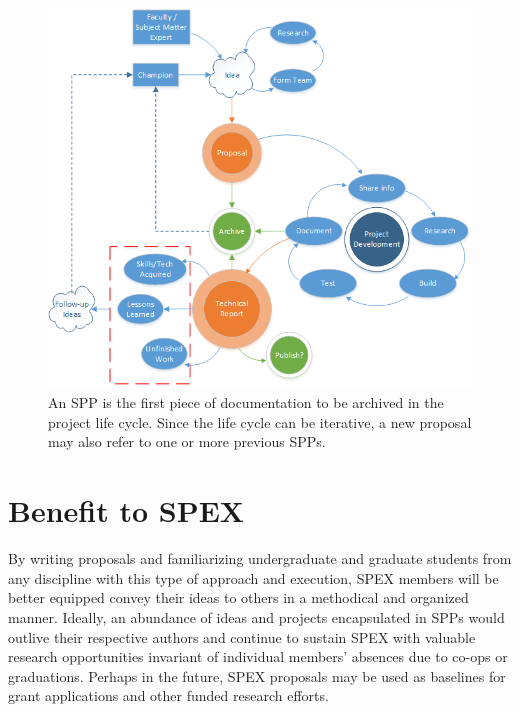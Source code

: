 \documentclass[journal]{SPEXformat}
\begin{document}
\begin{figure}
  \includegraphics[width=\linewidth]{figs/project-life-cycle.png}
  \caption{An SPP is the first piece of documentation to be archived in the project life cycle. Since the life cycle can be iterative, a new proposal may also refer to one or more previous SPPs.}
\label{fig:lifecycle}
\end{figure}

\section{Benefit to SPEX}
\label{sec:benefit}
By writing proposals and familiarizing undergraduate and graduate students from any discipline with this type of approach and execution, SPEX members will be better equipped convey their ideas to others in a methodical and organized manner.
Ideally, an abundance of ideas and projects encapsulated in SPPs would outlive their respective authors and continue to sustain SPEX with valuable research opportunities invariant of individual members' absences due to co-ops or graduations.
Perhaps in the future, SPEX proposals may be used as baselines for grant applications and other funded research efforts.
\end{document}
